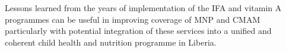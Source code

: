 \documentclass[12pt,a4paper]{article}
\theoremstyle{definition}
\theoremstyle{definition}
\theoremstyle{definition}
\theoremstyle{remark}
\begin{document}
Lessons learned from the years of implementation of the IFA and vitamin
A programmes can be useful in improving coverage of MNP and CMAM
particularly with potential integration of these services into a unified
and coherent child health and nutrition programme in Liberia.

\renewcommand\refname{References}

\end{document}

